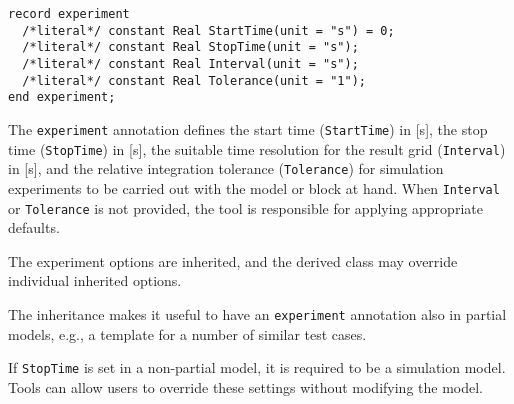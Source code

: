 \begin{annotationdefinition}[experiment]

\begin{synopsis}
\begin{lstlisting}[language=modelica]
record experiment
  /*literal*/ constant Real StartTime(unit = "s") = 0;
  /*literal*/ constant Real StopTime(unit = "s");
  /*literal*/ constant Real Interval(unit = "s");
  /*literal*/ constant Real Tolerance(unit = "1");
end experiment;
\end{lstlisting}
\end{synopsis}
\begin{semantics}
The \lstinline!experiment! annotation defines the start time (\lstinline!StartTime!) in {[}s{]}, the stop time (\lstinline!StopTime!) in {[}s{]}, the suitable time resolution for the result grid (\lstinline!Interval!) in {[}s{]}, and the relative integration tolerance (\lstinline!Tolerance!) for simulation experiments to be carried out with the model or block at hand.
When \lstinline!Interval! or \lstinline!Tolerance! is not provided, the tool is responsible for applying appropriate defaults.

The experiment options are inherited, and the derived class may override individual inherited options.
\begin{nonnormative}
The inheritance makes it useful to have an \lstinline!experiment! annotation also in partial models, e.g., a template for a number of similar test cases.
\end{nonnormative}

If \lstinline!StopTime! is set in a non-partial model, it is required to be a simulation model.
Tools can allow users to override these settings without modifying the model.
\end{semantics}
\end{annotationdefinition}

